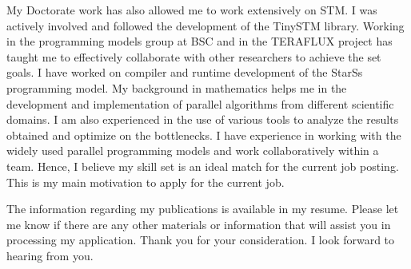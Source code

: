 \documentclass[10pt,stdletter,dateno]{newlfm}
\begin{document}
\begin{newlfm}
	   My Doctorate work has also allowed me to work extensively on STM. I was actively involved and followed the development of the TinySTM library.
	   Working in the programming models group at BSC and in the TERAFLUX project has taught me to effectively collaborate with other researchers to achieve the set goals.
	   I have worked on compiler and runtime development of the StarSs programming model.
	   My background in mathematics helps me in the development and implementation of parallel algorithms from different scientific domains.
	   I am also experienced in the use of various tools to analyze the results obtained and optimize on the bottlenecks.
	   I have experience in working with the widely used parallel programming models and work collaboratively within a team.
	   Hence, I believe my skill set is an ideal match for the current job posting. 
	   This is my main motivation to apply for the current job. 
%
	   \par
	   The information regarding my publications is available in my resume.
	   Please let me know if there are any other materials or information that will assist you in processing my application.
	   Thank you for your consideration. I look forward to hearing from you.
%
\end{newlfm}
\end{document}
